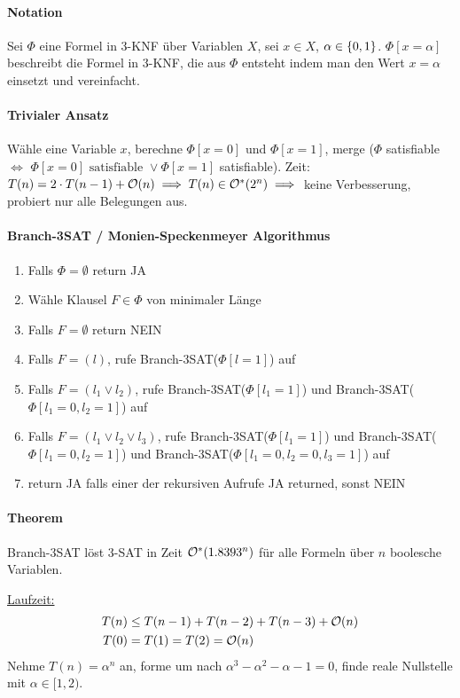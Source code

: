 \paragraph{Notation}
Sei $\Phi$ eine Formel in 3-KNF über Variablen $X$, sei $x \in X$, $\alpha \in \lbrace 0, 1 \rbrace$.
$\Phi[x=\alpha]$ beschreibt die Formel in 3-KNF, die aus $\Phi$ entsteht indem man den Wert $x=\alpha$ einsetzt
und vereinfacht.

\paragraph{Trivialer Ansatz}
Wähle eine Variable $x$, berechne $\Phi[x=0]$ und $\Phi[x=1]$,
merge ($\Phi$ satisfiable $\iff$ $\Phi[x=0] \text{ satisfiable } \vee \Phi[x=1]$ satisfiable).
Zeit: $T(n) = 2 \cdot T(n-1) + \mathcal{O}(n) \implies T(n) \in \mathcal{O}^*(2^n) \implies$ keine Verbesserung,
probiert nur alle Belegungen aus.

\paragraph{Branch-3SAT / Monien-Speckenmeyer Algorithmus}
\begin{enumerate}
    \item Falls $\Phi = \emptyset$ return JA
    \item Wähle Klausel $F \in  \Phi$ von minimaler Länge
    \item Falls $F = \emptyset$ return NEIN
    \item Falls $F = (l)$, rufe Branch-3SAT($\Phi[l=1]$) auf
    \item Falls $F = (l_1 \vee l_2)$, rufe Branch-3SAT($\Phi[l_1=1]$) und Branch-3SAT($\Phi[l_1=0, l_2=1]$) auf
    \item Falls $F = (l_1 \vee l_2 \vee l_3)$, rufe Branch-3SAT($\Phi[l_1=1]$) und
    Branch-3SAT($\Phi[l_1=0, l_2=1]$) und Branch-3SAT($\Phi[l_1=0, l_2=0, l_3=1]$) auf
    \item return JA falls einer der rekursiven Aufrufe JA returned, sonst NEIN
\end{enumerate}

\paragraph{Theorem}
Branch-3SAT löst 3-SAT in Zeit $\mathcal{O}^* (1.8393^n)$ für alle Formeln über $n$ boolesche Variablen.

\underline{Laufzeit:}
\begin{align*}
T(n) &\leq T(n-1) + T(n-2) + T(n-3) + \mathcal{O}(n) \\
T(0) &= T(1) = T(2) = \mathcal{O}(n)
\end{align*}
Nehme $T(n) = \alpha^n$ an, forme um nach $\alpha^3 - \alpha^2 - \alpha - 1 = 0$,
finde reale Nullstelle mit $\alpha \in [1,2)$.


